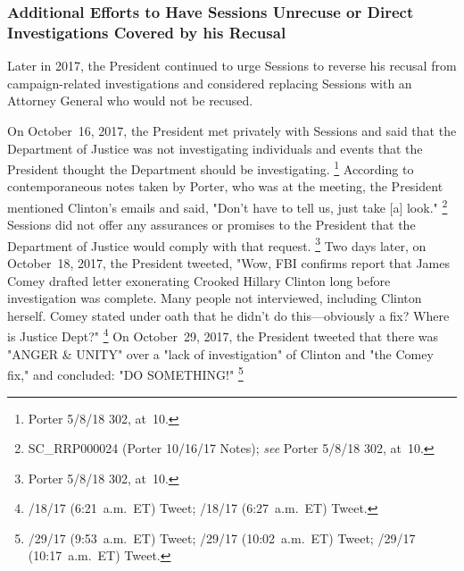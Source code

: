 \subsubsection{Additional Efforts to Have Sessions Unrecuse or Direct Investigations Covered by his Recusal}

Later in 2017, the President continued to urge Sessions to reverse his recusal from campaign-related investigations and considered replacing Sessions with an Attorney General who would not be recused.

On October~16, 2017, the President met privately with Sessions and said that the Department of Justice was not investigating individuals and events that the President thought the Department should be investigating.%
\footnote{Porter 5/8/18 302, at~10.}
According to contemporaneous notes taken by Porter, who was at the meeting, the President mentioned Clinton's emails and said, "Don't have to tell us, just take [a] look."%
\footnote{SC\_RRP000024 (Porter 10/16/17 Notes);
\textit{see} Porter 5/8/18 302, at~10.}
Sessions did not offer any assurances or promises to the President that the Department of Justice would comply with that request.%
\footnote{Porter 5/8/18 302, at~10.}
Two days later, on October~18, 2017, the President tweeted, "Wow, FBI confirms report that James Comey drafted letter exonerating Crooked Hillary Clinton long before investigation was complete.
Many people not interviewed, including Clinton herself.
Comey stated under oath that he didn't do this---obviously a fix?
Where is Justice Dept?"%
\footnote{/18/17 (6:21~a.m.~ET) Tweet;
/18/17 (6:27~a.m.~ET) Tweet.}
On October~29, 2017, the President tweeted that there was "ANGER \& UNITY" over a "lack of investigation" of Clinton and "the Comey fix," and concluded: "DO SOMETHING!"%
\footnote{/29/17 (9:53~a.m.~ET) Tweet;
/29/17 (10:02~a.m.~ET) Tweet;
/29/17 (10:17~a.m.~ET) Tweet.}

